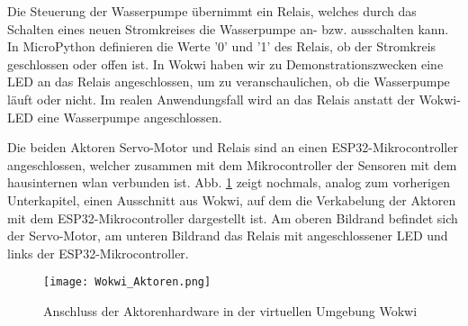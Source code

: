 Die Steuerung der Wasserpumpe übernimmt ein Relais, welches durch das Schalten eines neuen Stromkreises die Wasserpumpe an- bzw. ausschalten kann. In MicroPython definieren die Werte '0' und '1' des Relais, ob der Stromkreis geschlossen oder offen ist. In Wokwi haben wir zu Demonstrationszwecken eine LED an das Relais angeschlossen, um zu veranschaulichen, ob die Wasserpumpe läuft oder nicht. Im realen Anwendungsfall wird an das Relais anstatt der Wokwi-LED eine Wasserpumpe angeschlossen.

Die beiden Aktoren Servo-Motor und Relais sind an einen ESP32-Mikrocontroller angeschlossen, welcher zusammen mit dem Mikrocontroller der Sensoren mit dem hausinternen \gls{wlan} verbunden ist. Abb. \ref{fig:wokwi_aktoren} zeigt nochmals, analog zum vorherigen Unterkapitel, einen Ausschnitt aus Wokwi, auf dem die Verkabelung der Aktoren mit dem ESP32-Mikrocontroller dargestellt ist. Am oberen Bildrand befindet sich der Servo-Motor, am unteren Bildrand das Relais mit angeschlossener LED und links der ESP32-Mikrocontroller.

\begin{figure}[h]
    \centering
    \texttt{[image: Wokwi\_Aktoren.png]}
    \caption{Anschluss der Aktorenhardware in der virtuellen Umgebung Wokwi}\label{fig:wokwi_aktoren}
\end{figure}